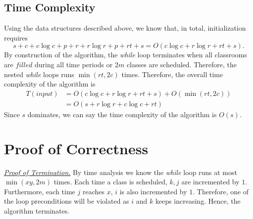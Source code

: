 \documentclass[11pt, oneside]{article}   	%
\begin{document}
\subsection{Time Complexity} %
Using the data structures described above, we know that, in total, initialization requires \[s+c+c\log c+p+r+r\log r+p+rt+s = O(c\log c+r\log r +rt+s).\] By construction of the algorithm, the {\it while} loop terminates when all classrooms are $filled$ during all time periods or $2m$ classes are scheduled. Therefore, the nested {\it while} loops runs $\min(rt, 2c)$ times. Therefore, the overall time complexity of the algorithm is 
\begin{align*}
T(input) &= O(c\log c+r\log r +rt+s)+O(\min(rt, 2c))\\
& = O(s+r\log r+c\log c +rt)
\end{align*}
Since $s$ dominates, we can say the time complexity of the algorithm is $O(s)$.

\section{Proof of Correctness}
\underline{\textit{Proof of Termination.}} By time analysis we know the {\it while} loop runs at most $\min(xy, 2m)$ times. Each time a class is scheduled, $k, j$ are incremented by $1$. Furthermore, each time $j$ reaches $x$, $i$ is also incremented by $1$. Therefore, one of the loop preconditions will be violated as $i$ and $k$ keeps increasing. Hence, the algorithm terminates.
\end{document}
